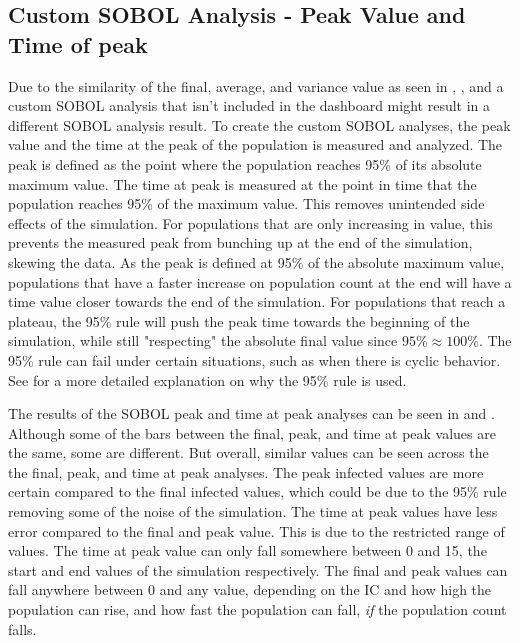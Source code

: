 \subsection{Custom SOBOL Analysis - Peak Value and Time of peak}
Due to the similarity of the final, average, and variance value as seen in , , and  a custom SOBOL analysis that isn't included in the dashboard might result in a different SOBOL analysis result. 
To create the custom SOBOL analyses, the peak value and the time at the peak of the population is measured and analyzed. 
The peak is defined as the point where the population reaches 95\% of its absolute maximum value. 
The time at peak is measured at the point in time that the population reaches 95\% of the maximum value. 
This removes unintended side effects of the simulation. 
For populations that are only increasing in value, this prevents the measured peak from bunching up at the end of the simulation, skewing the data. 
As the peak is defined at 95\% of the absolute maximum value, populations that have a faster increase on population count at the end will have a time value closer towards the end of the simulation. 
For populations that reach a plateau, the 95\% rule will push the peak time towards the beginning of the simulation, while still "respecting" the absolute final value since $95\% \approx 100\%$. 
The 95\% rule can fail under certain situations, such as when there is cyclic behavior. 
See  for a more detailed explanation on why the 95\% rule is used. 

The results of the SOBOL peak and time at peak analyses can be seen in  and . 
Although some of the bars between the final, peak, and time at peak values are the same, some are different. 
But overall, similar values can be seen across the the final, peak, and time at peak analyses. 
The peak infected values are more certain compared to the final infected values, which could be due to the 95\% rule removing some of the noise of the simulation. 
The time at peak values have less error compared to the final and peak value. 
This is due to the restricted range of values. The time at peak value can only fall somewhere between 0 and 15, the start and end values of the simulation respectively. 
The final and peak values can fall anywhere between 0 and any value, depending on the IC and how high the population can rise, and how fast the population can fall, \textit{if} the population count falls. 

